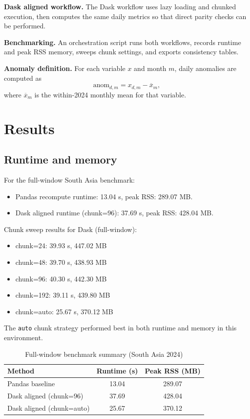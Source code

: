 \textbf{Dask aligned workflow.}
The Dask workflow uses lazy loading and chunked execution, then computes the
same daily metrics so that direct parity checks can be performed.

\textbf{Benchmarking.}
An orchestration script runs both workflows, records runtime and peak RSS
memory, sweeps chunk settings, and exports consistency tables.

\textbf{Anomaly definition.}
For each variable $x$ and month $m$, daily anomalies are computed as
\[
\text{anom}_{d,m} = x_{d,m} - \overline{x}_{m},
\]
where $\overline{x}_{m}$ is the within-2024 monthly mean for that variable.

\section{Results}
\subsection{Runtime and memory}
For the full-window South Asia benchmark:
\begin{itemize}
    \item Pandas recompute runtime: 13.04 s, peak RSS: 289.07 MB.
    \item Dask aligned runtime (chunk=96): 37.69 s, peak RSS: 428.04 MB.
\end{itemize}

Chunk sweep results for Dask (full-window):
\begin{itemize}
    \item chunk=24: 39.93 s, 447.02 MB
    \item chunk=48: 39.70 s, 438.93 MB
    \item chunk=96: 40.30 s, 442.30 MB
    \item chunk=192: 39.11 s, 439.80 MB
    \item chunk=auto: 25.67 s, 370.12 MB
\end{itemize}

The \verb|auto| chunk strategy performed best in both runtime and memory in
this environment.

\begin{table}[h]
    \centering
    \caption{Full-window benchmark summary (South Asia 2024)}
    \begin{tabular}{lcc}
        \hline
        Method & Runtime (s) & Peak RSS (MB) \\
        \hline
        Pandas baseline & 13.04 & 289.07 \\
        Dask aligned (chunk=96) & 37.69 & 428.04 \\
        Dask aligned (chunk=auto) & 25.67 & 370.12 \\
        \hline
    \end{tabular}
\end{table}

